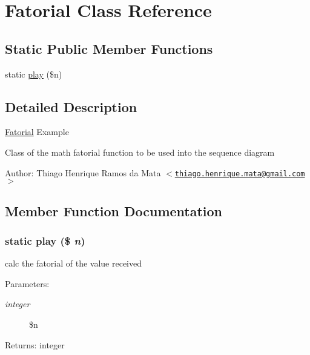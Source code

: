 \hypertarget{class_fatorial}{
\section{Fatorial Class Reference}
\label{class_fatorial}
}
\subsection*{Static Public Member Functions}
\begin{CompactItemize}
\item 
static \hyperlink{class_fatorial_c8f7f713202622f47a224466b1d41111}{play} (\$n)
\end{CompactItemize}


\subsection{Detailed Description}
\hyperlink{class_fatorial}{Fatorial} Example

Class of the math fatorial function to be used into the sequence diagram

\begin{Desc}
\item[Author:]Thiago Henrique Ramos da Mata $<$\href{mailto:thiago.henrique.mata@gmail.com}{\tt thiago.henrique.mata@gmail.com}$>$ \end{Desc}


\subsection{Member Function Documentation}
\hypertarget{class_fatorial_c8f7f713202622f47a224466b1d41111}{
\subsubsection[{play}]{\setlength{\rightskip}{0pt plus 5cm}static play (\$ {\em n})}}
\label{class_fatorial_c8f7f713202622f47a224466b1d41111}


calc the fatorial of the value received

\begin{Desc}
\item[Parameters:]
\begin{description}
\item[{\em integer}]\$n \end{description}
\end{Desc}
\begin{Desc}
\item[Returns:]integer \end{Desc}


